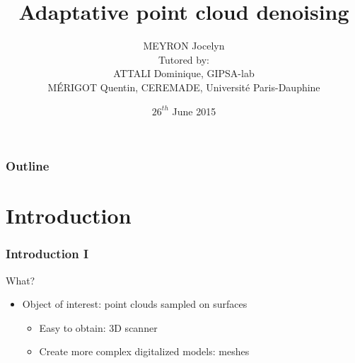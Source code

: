 \documentclass{beamer}
\title[Adaptative point cloud denoising]{Adaptative point cloud denoising}
\author[MEYRON Jocelyn]{MEYRON Jocelyn\\\scriptsize{Tutored by:\\
        ATTALI Dominique, GIPSA-lab\\
        MÉRIGOT Quentin, CEREMADE, Université Paris-Dauphine}}
\institute{GIPSA-lab}
\date{$ 26^{th} $ June 2015}
\begin{document}
\begin{frame}
    \titlepage
\end{frame}

\begin{frame}
    \frametitle{Outline}
    \tableofcontents
\end{frame}

\section{Introduction}

\begin{frame}
    \frametitle{Introduction I}


    What?
    \begin{itemize}
        \item Object of interest: point clouds sampled on surfaces
            \begin{itemize}
                \item Easy to obtain: 3D scanner
                \item Create more complex digitalized models: meshes
            \end{itemize}
    \end{itemize}


\end{frame}
\end{document}
